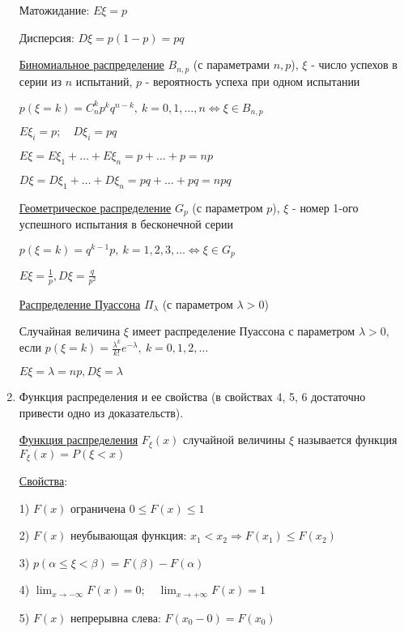 \documentclass[12pt]{article}
\begin{document}
\begin{enumerate}
    Матожидание: $E\xi = p$

    Дисперсия: $D\xi = p(1 - p) = pq$

    \hyperlink{binomialdistributionproperties}{Биномиальное распределение} $B_{n,p}$ (с параметрами $n, p$),
    $\xi$ - число успехов в серии из $n$ испытаний, $p$ - вероятность успеха при одном испытании

    $p(\xi = k) = C^k_n p^k q^{n - k}, \ k = 0, 1, \dots, n \Longleftrightarrow \xi \in B_{n,p}$

    $E\xi_i = p; \quad D\xi_i = pq$

    $E\xi = E\xi_1 + \dots + E\xi_n = p + \dots + p = np$

    $D\xi = D\xi_1 + \dots + D\xi_n = pq + \dots + pq = npq$

    \hyperlink{geometricdistributionproperties}{Геометрическое распределение} $G_p$ (с параметром $p$),
    $\xi$ - номер 1-ого успешного испытания в бесконечной серии

    $p(\xi = k) = q^{k - 1}p, \ k = 1, 2, 3, \dots \Longleftrightarrow \xi \in G_p$

    $E\xi = \frac{1}{p}, D\xi  = \frac{q}{p^2}$

    \hyperlink{poissondistribution}{Распределение Пуассона} $\Pi_\lambda$ (с параметром $\lambda > 0$)

    Случайная величина $\xi$ имеет распределение Пуассона с параметром $\lambda > 0$, если $p(\xi = k) = \frac{\lambda^k}{k!}e^{-\lambda}, \ k = 0, 1, 2, \dots$

    $E\xi = \lambda = np, D\xi = \lambda$


    \item Функция распределения и ее свойства (в свойствах 4, 5, 6 достаточно привести одно из доказательств).
    
    \hyperlink{distributionfunction}{Функция распределения} $F_\xi(x)$ случайной величины $\xi$ называется функция $F_\xi(x) = P(\xi < x)$

    \hyperlink{distributionfunctionproperties}{Свойства}: 

    1) $F(x)$ ограничена $0 \leq F(x) \leq 1$

    2) $F(x)$ неубывающая функция: $x_1 < x_2 \Longrightarrow F(x_1) \leq F(x_2)$ 

    3) $p(\alpha \leq \xi < \beta) = F(\beta) - F(\alpha)$

    4) $\lim_{x \to -\infty} F(x) = 0; \quad \lim_{x \to +\infty} F(x) = 1$
    
    5) $F(x)$ непрерывна слева: $F(x_0 - 0) = F(x_0)$


\end{enumerate}
\end{document}
